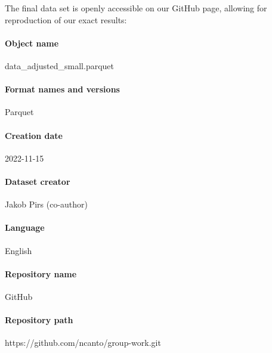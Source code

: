 The final data set is openly accessible on our GitHub page, allowing for reproduction of our exact results:
\paragraph{Object name} data\_adjusted\_small.parquet
\paragraph{Format names and versions} Parquet
\paragraph{Creation date} 2022-11-15
\paragraph{Dataset creator} Jakob Pirs (co-author)
\paragraph{Language} English
\paragraph{Repository name} GitHub 
\paragraph{Repository path} https://github.com/ncanto/group-work.git


